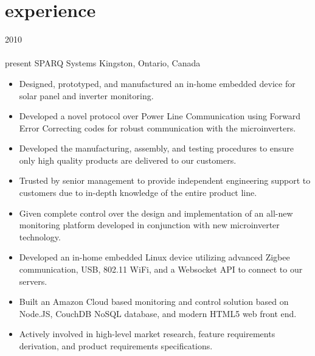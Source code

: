 
\section{experience}

\begin{entrylist}
\entry
  {2010\\\faChevronDown\\{\bodyfontit present}}
  {SPARQ Systems}
  {Kingston, Ontario, Canada}
  {
\begin{itemize}[leftmargin=12pt]
	\item Designed, prototyped, and manufactured an in-home {\bodyfontit embedded device} for solar panel and inverter monitoring.
	\item Developed a novel protocol over Power Line Communication using Forward Error Correcting codes for robust communication with the microinverters.
	\item Developed the manufacturing, assembly, and testing procedures to ensure only high quality products are delivered to our customers.
	\item Trusted by senior management to provide independent engineering support to customers due to in-depth knowledge of the entire product line.
\end{itemize}
\begin{itemize}[leftmargin=12pt]
	\item Given complete control over the design and implementation of an all-new monitoring platform developed in conjunction with new microinverter technology.
  \item Developed an in-home embedded {\bodyfontit Linux} device utilizing advanced {\bodyfontit Zigbee} communication, USB, 802.11 {\bodyfontit WiFi}, and a {\bodyfontit Websocket} API to connect to our servers.
  \item Built an Amazon {\bodyfontit Cloud} based monitoring and control solution based on {\bodyfontit Node.JS}, {\bodyfontit CouchDB} NoSQL database, and modern {\bodyfontit HTML5} web front end.
	\item Actively involved in high-level market research, feature requirements derivation, and product requirements specifications.

\end{itemize}}
\end{entrylist}
